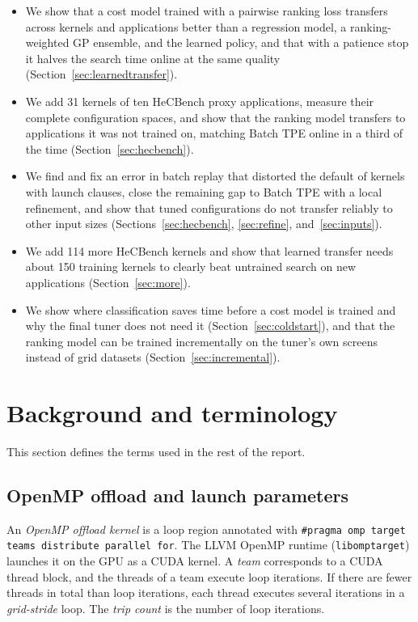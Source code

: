 \documentclass[10pt]{article}
\newcommand{\code}[1]{\texttt{#1}}
\begin{document}
\begin{itemize}
  the same applications the transfer model remains better
  (Section~\ref{sec:rl}).
\item We show that a cost model trained with a pairwise ranking loss
  transfers across kernels and applications better than a regression model,
  a ranking-weighted GP ensemble, and the learned policy, and that with a
  patience stop it halves the search time online at the same quality
  (Section~\ref{sec:learnedtransfer}).
\item We add 31 kernels of ten HeCBench proxy applications, measure their
  complete configuration spaces, and show that the ranking model transfers to
  applications it was not trained on, matching Batch TPE online in a third of the
  time (Section~\ref{sec:hecbench}).
\item We find and fix an error in batch replay that distorted the default of
  kernels with launch clauses, close the remaining gap to Batch TPE with a local
  refinement, and show that tuned configurations do not transfer reliably to
  other input sizes (Sections~\ref{sec:hecbench}, \ref{sec:refine},
  and~\ref{sec:inputs}).
\item We add 114 more HeCBench kernels and show that learned transfer needs about
  150 training kernels to clearly beat untrained search on new applications
  (Section~\ref{sec:more}).
\item We show where classification saves time before a cost model is trained and
  why the final tuner does not need it (Section~\ref{sec:coldstart}), and that
  the ranking model can be trained incrementally on the tuner's own screens
  instead of grid datasets (Section~\ref{sec:incremental}).
\end{itemize}

\section{Background and terminology}
\label{sec:background}

This section defines the terms used in the rest of the report.

\subsection{OpenMP offload and launch parameters}
An \emph{OpenMP offload kernel} is a loop region annotated with
\code{\#pragma omp target teams distribute parallel for}. The LLVM OpenMP
runtime (\code{libomptarget}) launches it on the GPU as a CUDA kernel. A
\emph{team} corresponds to a CUDA thread block, and the threads of a team
execute loop iterations. If there are fewer threads in total than loop
iterations, each thread executes several iterations in a \emph{grid-stride}
loop. The \emph{trip count} is the number of loop iterations.
\end{document}
